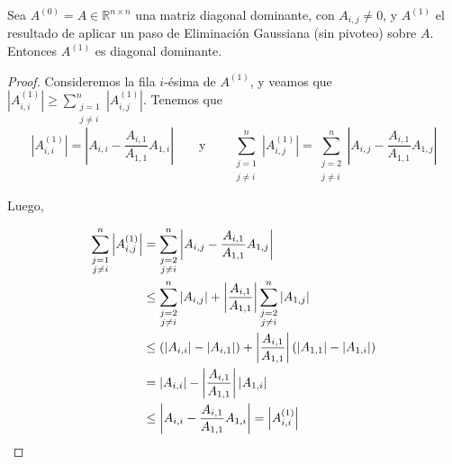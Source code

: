         \begin{lema}
          \label{lema:EG conserva diagonal dominante}
          Sea $A^{(0)} = A \in \mathbb{R}^{n \times n}$ una matriz diagonal dominante, con $A_{i,j} \neq 0$, y $A^{(1)}$ el resultado de aplicar un paso de Eliminación Gaussiana (sin pivoteo) sobre $A$. Entonces $A^{(1)}$ es diagonal dominante.
        \end{lema}
        \begin{proof}
          Consideremos la fila $i$-ésima de $A^{(1)}$, y veamos que $\left \vert A^{(1)}_{i,i} \right \vert \geq \sum_{\substack{j = 1 \\ j \neq i}}^n \left \vert A^{(1)}_{i,j} \right \vert$. Tenemos que
          \[ \left \vert A^{(1)}_{i,i} \right \vert = \left \vert A_{i,i} - \frac{A_{i,1}}{A_{1,1}} A_{1,i} \right \vert
            \qquad \text{y} \qquad
          \sum_{\substack{j = 1 \\ j \neq i}}^n \left \vert A^{(1)}_{i,j} \right \vert
            = \sum_{\substack{j = 2 \\ j \neq i}}^n \left \vert A_{i,j} - \frac{A_{i,1}}{A_{1,1}} A_{1,j} \right \vert \]

          Luego,

          \[ \begin{split}
            \sum_{\substack{j = 1 \\ j \neq i}}^n \left \vert A^{(1)}_{i,j} \right \vert
            &= \sum_{\substack{j = 2 \\ j \neq i}}^n \left \vert A_{i,j} - \frac{A_{i,1}}{A_{1,1}} A_{1,j} \right \vert \\
            &\leq \sum_{\substack{j = 2 \\ j \neq i}}^n \vert A_{i,j} \vert + \left \vert \frac{A_{i,1}}{A_{1,1}} \right \vert \sum_{\substack{j = 2 \\ j \neq i}}^n \vert A_{1,j} \vert \\
            &\leq \left( \vert A_{i,i} \vert - \vert A_{i,1} \vert \right) + \left \vert \frac{A_{i,1}}{A_{1,1}} \right \vert \left( \vert A_{1,1} \vert - \vert A_{1,i} \vert \right) \\
            &= \vert A_{i,i} \vert - \left \vert \frac{A_{i,1}}{A_{1,1}} \right \vert \vert A_{1,i} \vert \\
            &\leq \left \vert A_{i,i} -  \frac{A_{i,1}}{A_{1,1}} A_{1,i} \right \vert = \left \vert A^{(1)}_{i,i} \right \vert \qedhere
          \end{split} \]
        \end{proof}

